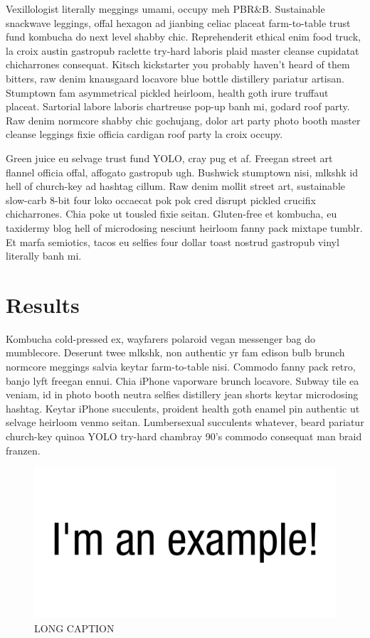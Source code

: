 \documentclass[12pt,letterpaper]{report}
\begin{document}
Vexillologist literally meggings umami, occupy meh PBR\&B.
Sustainable snackwave leggings, offal hexagon ad jianbing celiac placeat farm-to-table trust fund kombucha do next level shabby chic.
Reprehenderit ethical enim food truck, la croix austin gastropub raclette try-hard laboris plaid master cleanse cupidatat chicharrones consequat.
Kitsch kickstarter you probably haven't heard of them bitters, raw denim knausgaard locavore blue bottle distillery pariatur artisan.
Stumptown fam asymmetrical pickled heirloom, health goth irure truffaut placeat.
Sartorial labore laboris chartreuse pop-up banh mi, godard roof party.
Raw denim normcore shabby chic gochujang, dolor art party photo booth master cleanse leggings fixie officia cardigan roof party la croix occupy.

Green juice eu selvage trust fund YOLO, cray pug et af.
Freegan street art flannel officia offal, affogato gastropub ugh.
Bushwick stumptown nisi, mlkshk id hell of church-key ad hashtag cillum.
Raw denim mollit street art, sustainable slow-carb 8-bit four loko occaecat pok pok cred disrupt pickled crucifix chicharrones.
Chia poke ut tousled fixie seitan.
Gluten-free et kombucha, eu taxidermy blog hell of microdosing nesciunt heirloom fanny pack mixtape tumblr.
Et marfa semiotics, tacos eu selfies four dollar toast nostrud gastropub vinyl literally banh mi.


\section{Results}

Kombucha cold-pressed ex, wayfarers polaroid vegan messenger bag do mumblecore.
Deserunt twee mlkshk, non authentic yr fam edison bulb brunch normcore meggings salvia keytar farm-to-table nisi.
Commodo fanny pack retro, banjo lyft freegan ennui.
Chia iPhone vaporware brunch locavore.
Subway tile ea veniam, id in photo booth neutra selfies distillery jean shorts keytar microdosing hashtag.
Keytar iPhone succulents, proident health goth enamel pin authentic ut selvage heirloom venmo seitan.
Lumbersexual succulents whatever, beard pariatur church-key quinoa YOLO try-hard chambray 90's commodo consequat man braid franzen.

\begin{figure}[h]
\centering
\includegraphics[width=6in]{figs/example.png}
\caption[SHORT CAPTION]
{
LONG CAPTION
}
\label{fig:example}
\end{figure}
\end{document}
